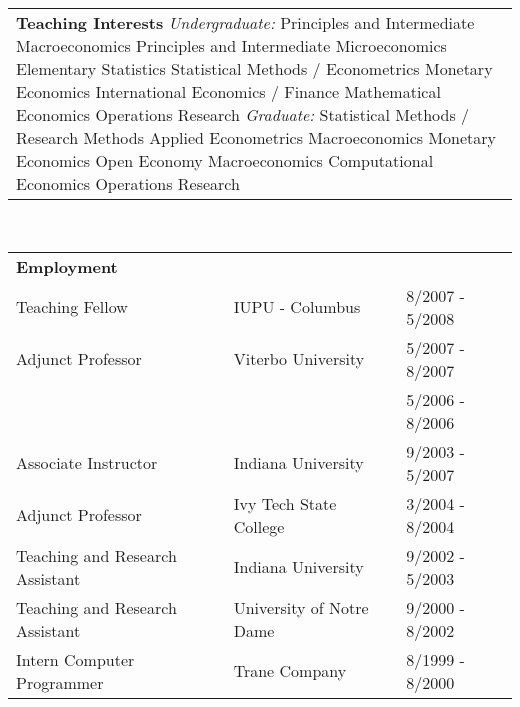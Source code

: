 \documentclass[12pt,notitlepage,oneside]{book}
\begin{document}
\begin{singlespace}
\newpage

\begin{tabular}{p{6in}}
\textbf{Teaching Interests} \newline
\textit{Undergraduate:}\newline
Principles and Intermediate Macroeconomics \newline
Principles and Intermediate Microeconomics \newline
Elementary Statistics\newline
Statistical Methods / Econometrics \newline
Monetary Economics \newline
International Economics / Finance \newline 
Mathematical Economics \newline 
Operations Research \newline \newline
\textit{Graduate:}\newline
Statistical Methods / Research Methods \newline
Applied Econometrics \newline
Macroeconomics \newline
Monetary Economics \newline
Open Economy Macroeconomics \newline
Computational Economics \newline
Operations Research \newline
\end{tabular} \\

\begin{tabular}{p{2.5in} p{1.7in} p{1.5in}}
\textbf{Employment} \\
Teaching Fellow & IUPU - Columbus & 8/2007 - 5/2008 \\
Adjunct Professor & Viterbo University & 5/2007 - 8/2007 \\
 & & 5/2006 - 8/2006 \\
Associate Instructor & Indiana University & 9/2003 - 5/2007 \\
Adjunct Professor & Ivy Tech State College & 3/2004 - 8/2004 \\
Teaching and Research Assistant & Indiana University & 9/2002 - 5/2003 \\
Teaching and Research Assistant & University of Notre Dame & 9/2000 - 8/2002 \\
Intern Computer Programmer & Trane Company & 8/1999 - 8/2000 \\
\end{tabular} \\ \\


\end{singlespace}
\end{document}
